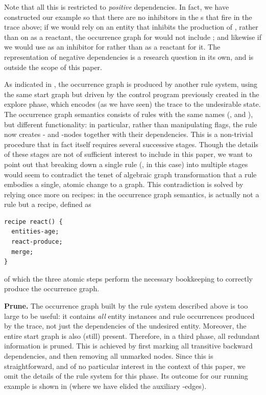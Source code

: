 Note that all this is restricted to \emph{positive} dependencies. In fact, we have constructed our example so that there are no inhibitors in the \Rule{}s that fire in the trace above; if we would rely on an entity \milk that inhibits the production of \espresso, rather than on \nomilk as a reactant, the occurrence graph for \bang would not include \milk; and likewise if we would use \cappuccino as an inhibitor for \anger rather than \espresso as a reactant for it. The representation of negative dependencies is a research question in its own, and is outside the scope of this paper.

As indicated in , the occurrence graph is produced by another \GROOVE rule system, using the same start graph but driven by the control program previously created in the explore phase, which encodes (as we have seen) the trace to the undesirable state. The occurrence graph semantics consists of rules with the same names (\reactR, \contextR and \firedR), but different functionality: in particular, rather than manipulating \present flags, the \reactR rule now creates \RuleOcc- and \EntityInst-nodes together with their dependencies. This is a non-trivial procedure that in fact itself requires several successive stages. Though the details of these stages are not of sufficient interest to include in this paper, we want to point out that breaking down a single rule (\reactR, in this case) into multiple stages would seem to contradict the tenet of algebraic graph transformation that a rule embodies a single, atomic change to a graph. This contradiction is solved by relying once more on \GROOVE recipes: in the occurrence graph semantics, \reactR is actually not a rule but a recipe, defined as

\begin{center}
\begin{lstlisting}[]
recipe react() {
  entities-age;
  react-produce;
  merge;
}
\end{lstlisting}
\end{center}
%
of which the three atomic steps perform the necessary bookkeeping to correctly produce the occurrence graph.

\medskip\noindent\textbf{Prune.}
%
The occurrence graph built by the rule system described above is too large to be useful: it contains \emph{all} entity instances and rule occurrences produced by the trace, not just the dependencies of the undesired \Forbidden entity. Moreover, the entire start graph is also (still) present. Therefore, in a third phase, all redundant information is pruned. This is achieved by first marking all transitive backward dependencies, and then removing all unmarked nodes. Since this is straightforward, and of no particular interest in the context of this paper, we omit the details of the \GROOVE rule system for this phase. Its outcome for our running example is shown in  (where we have elided the auxiliary \depends-edges).


